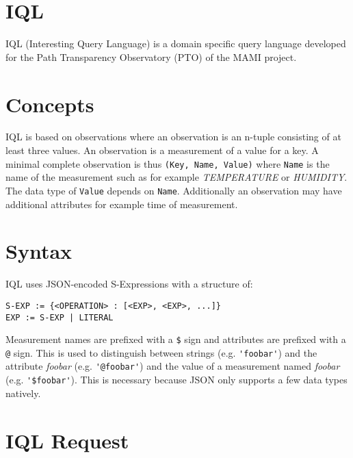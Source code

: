 \documentclass[12pt]{article}
\begin{document}
\setlength\parindent{0pt}
\maketitle


\section{IQL}

IQL (Interesting Query Language) is a domain specific query language developed for the Path Transparency Observatory (PTO) of the MAMI project. 

\section{Concepts}

IQL is based on observations where an observation is an n-tuple consisting of at least three values. An observation is a measurement of a value for a key.
A minimal complete observation is thus \verb|(Key, Name, Value)| where \verb|Name| is the name of the measurement such as for example \textit{TEMPERATURE} or
\textit{HUMIDITY}. The data type of \verb|Value| depends on \verb|Name|. Additionally an observation may have additional attributes for example time of measurement. 

\section{Syntax}

IQL uses JSON-encoded S-Expressions with a structure of:

\begin{verbatim}
S-EXP := {<OPERATION> : [<EXP>, <EXP>, ...]}
EXP := S-EXP | LITERAL
\end{verbatim}

Measurement names are prefixed with a \verb|$| sign and attributes are prefixed with a \verb|@| sign. This is used to distinguish between strings (e.g. \verb|'foobar'|)
and the attribute \textit{foobar} (e.g. \verb|'@foobar'|) and the value of a measurement named \textit{foobar} (e.g. \verb|'$foobar'|). This is necessary because JSON only
supports a few data types natively.

\section{IQL Request}
\end{document}
